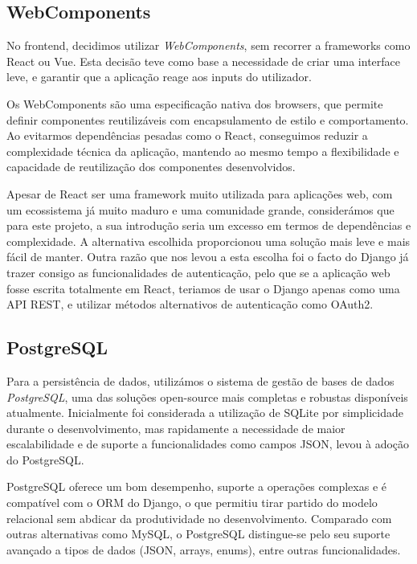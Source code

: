 \subsection{WebComponents}

No frontend, decidimos utilizar \textit{WebComponents}, sem recorrer a frameworks como React ou Vue. Esta decisão teve como base a necessidade de criar uma interface leve, e garantir que a aplicação reage aos inputs do utilizador. 

Os WebComponents são uma especificação nativa dos browsers, que permite definir componentes reutilizáveis com encapsulamento de estilo e comportamento. Ao evitarmos dependências pesadas como o React, conseguimos reduzir a complexidade técnica da aplicação, mantendo ao mesmo tempo a flexibilidade e capacidade de reutilização dos componentes desenvolvidos.

Apesar de React ser uma framework muito utilizada para aplicações web,  com um ecossistema já muito maduro e uma comunidade grande, considerámos que para este projeto, a sua introdução seria um excesso em termos de dependências e complexidade. A alternativa escolhida proporcionou uma solução mais leve e mais fácil de manter. Outra razão que nos levou a esta escolha foi o facto do Django já trazer consigo as funcionalidades de autenticação, pelo que se a aplicação web fosse escrita totalmente em React, teriamos de usar o Django apenas como uma API REST, e utilizar métodos alternativos de autenticação como OAuth2.

\subsection{PostgreSQL}

Para a persistência de dados, utilizámos o sistema de gestão de bases de dados \textit{PostgreSQL}, uma das soluções open-source mais completas e robustas disponíveis atualmente. Inicialmente foi considerada a utilização de SQLite por simplicidade durante o desenvolvimento, mas rapidamente a necessidade de maior escalabilidade e de suporte a funcionalidades como campos JSON, levou à adoção do PostgreSQL.

PostgreSQL oferece um bom desempenho, suporte a operações complexas e é compatível com o ORM do Django, o que permitiu tirar partido do modelo relacional sem abdicar da produtividade no desenvolvimento. Comparado com outras alternativas como MySQL, o PostgreSQL distingue-se pelo seu suporte avançado a tipos de dados (\gls{JSON}, arrays, enums), entre outras funcionalidades.

